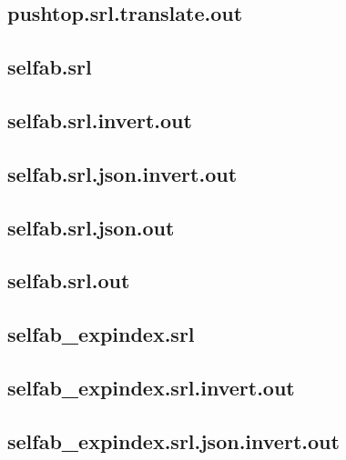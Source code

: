 \subsection{pushtop.srl.translate.out}
\label{app:pushtop_srl.translate.out}

\subsection{selfab.srl}
\label{app:selfab_srl}

\subsection{selfab.srl.invert.out}
\label{app:selfab_srl.invert.out}

\subsection{selfab.srl.json.invert.out}
\label{app:selfab_srl.json.invert.out}

\subsection{selfab.srl.json.out}
\label{app:selfab_srl.json.out}

\subsection{selfab.srl.out}
\label{app:selfab_srl.out}

\subsection{selfab\_expindex.srl}
\label{app:selfab_expindex_srl}

\subsection{selfab\_expindex.srl.invert.out}
\label{app:selfab_expindex_srl.invert.out}

\subsection{selfab\_expindex.srl.json.invert.out}
\label{app:selfab_expindex_srl.json.invert.out}


